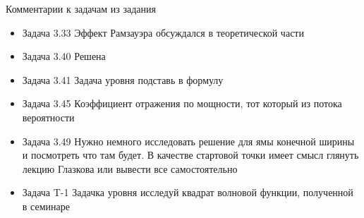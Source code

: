 \documentclass[12]{beamer}
\begin{document}
\begin{frame}[t]{Комментарии к задачам из задания}\scriptsize
\begin{itemize}
\item{Задача 3.33} Эффект Рамзауэра обсуждался в теоретической части
\item{Задача 3.40} Решена
\item{Задача 3.41} Задача уровня подставь в формулу
\item{Задача 3.45} Коэффициент отражения по мощности, тот который из потока вероятности 
\item{Задача 3.49} Нужно немного исследовать решение для ямы конечной ширины и посмотреть что там будет. В качестве стартовой точки имеет смысл глянуть лекцию Глазкова или вывести все самостоятельно
\item{Задача T-1} Задачка уровня исследуй квадрат волновой функции, полученной в семинаре

\end{itemize}
\end{frame}
\end{document}
